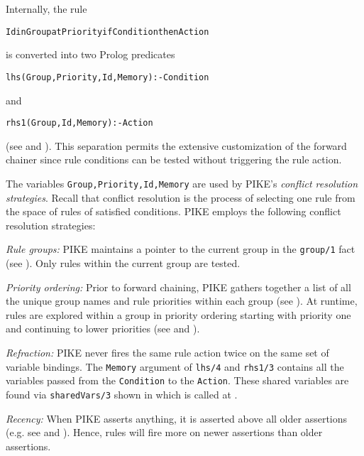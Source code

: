 \documentclass[twocolumn,global]{sys/svjour}
\begin{document}



Internally, the rule {\small
\begin{alltt}
Id in Group at Priority if Condition then Action
\end{alltt}
} is converted into two Prolog predicates

{\small
\begin{alltt}
lhs(Group,Priority,Id,Memory) :- Condition
\end{alltt}
} and {\small
\begin{alltt}
rhs1(Group,Id,Memory) :- Action
\end{alltt}
} (see  and ). This
separation permits the extensive customization of the forward chainer
since rule conditions can be tested without triggering the rule
action.


The variables {\tt Group,Priority,Id,Memory} are used by PIKE's {\em
conflict resolution strategies}. Recall that conflict resolution is
the process of selecting one rule from the space of rules of
satisfied conditions. PIKE employs the following conflict resolution
strategies: \bd \item[{\em Rule groups:}] PIKE maintains a pointer to
the current group in the {\tt group/1} fact (see
). Only rules within the current group are
tested. \item[{\em Priority ordering:}] Prior to forward chaining,
PIKE gathers together a list of all the unique group names and rule
priorities within each group (see ). At
runtime, rules are explored within a group in priority ordering
starting with priority one and continuing to lower priorities (see
  and   ).
\item[{\em Refraction:}] PIKE never fires the same rule action twice
on the same set of variable bindings. The {\tt Memory} argument of
{\tt lhs/4} and {\tt rhs1/3} contains all the variables passed from
the {\tt Condition} to the {\tt Action}. These shared variables are
found via {\tt sharedVars/3} shown in  which is
called at . \item[{\em Recency:}] When PIKE
asserts anything, it is asserted
 above all older assertions (e.g. see  and ).
 Hence, rules will fire more on newer
 assertions than older assertions. \ed
\end{document}
